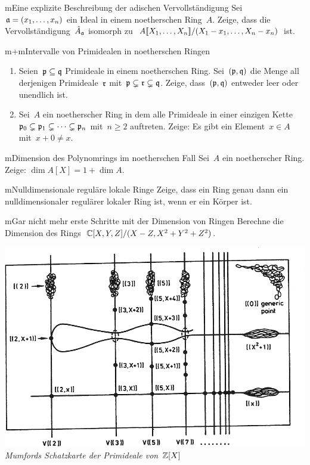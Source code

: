 \documentclass[entwurf]{uebblatt}
\begin{document}

\begin{aufgabe}{m}{Eine explizite Beschreibung der adischen Vervollständigung}
Sei~$\mathfrak{a} = (x_1,\ldots,x_n)$ ein Ideal in einem noetherschen Ring~$A$. Zeige,
dass die Vervollständigung~$\hat A_{\mathfrak{a}}$ isomorph
zu~${A}\llbracket{X_1,\ldots,X_n}\rrbracket/(X_1-x_1,\ldots,X_n-x_n)$ ist.
\end{aufgabe}

\begin{aufgabe}{m+m}{Intervalle von Primidealen in noetherschen Ringen}
\begin{enumerate}
\item
Seien~$\mathfrak{p} \subseteq \mathfrak{q}$ Primideale in einem
noetherschen Ring. Sei~$(\mathfrak{p},\mathfrak{q})$ die Menge all derjenigen Primideale~$\mathfrak{r}$
mit~$\mathfrak{p} \subsetneq \mathfrak{r} \subsetneq \mathfrak{q}$. Zeige, dass~$(\mathfrak{p},\mathfrak{q})$ entweder
leer oder unendlich ist.
\item Sei~$A$ ein noetherscher Ring in dem alle Primideale in einer einzigen Kette~$\mathfrak{p}_0
\subsetneq \mathfrak{p}_1 \subsetneq \cdots \subsetneq \mathfrak{p}_n$ mit~$n \geq 2$ auftreten.
Zeige: Es gibt ein Element~$x \in A$ mit~$x + 0 \neq x$.
\end{enumerate}
\end{aufgabe}

\begin{aufgabe}{m}{Dimension des Polynomrings im noetherschen Fall}
Sei~$A$ ein noetherscher Ring. Zeige: $\dim A[X] = 1 + \dim A$.
\end{aufgabe}

\begin{aufgabe}{m}{Nulldimensionale reguläre lokale Ringe}
Zeige, dass ein Ring genau dann ein nulldimensionaler regulärer lokaler Ring
ist, wenn er ein Körper ist.
\end{aufgabe}

\begin{aufgabe}{m}{Gar nicht mehr erste Schritte mit der Dimension von Ringen}
Berechne die Dimension des Rings~$\mathbb{C}[X,Y,Z]/(X-Z, X^2+Y^2+Z^2)$.
\end{aufgabe}

\vfill
\centering
\href{http://www.neverendingbooks.org/mumfords-treasure-map}{\includegraphics[scale=0.4]{images/mumfords-treasure-map}} \\[0.5em]
\emph{Mumfords Schatzkarte der Primideale von~$\mathbb{Z}[X]$}
\end{document}
